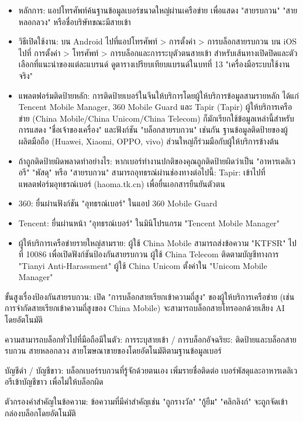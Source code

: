 
\begin{itemize}
  \item หลักการ: แอปโทรศัพท์ค้นฐานข้อมูลเบอร์ขนาดใหญ่ผ่านเครือข่าย เพื่อแสดง "สายรบกวน" "สายหลอกลวง" หรือชื่อบริษัทขณะมีสายเข้า
  \item วิธีเปิดใช้งาน: บน Android ไปที่แอปโทรศัพท์ > การตั้งค่า > การบล็อกสายรบกวน บน iOS ไปที่ การตั้งค่า > โทรศัพท์ > การบล็อกและการระบุตัวตนสายเข้า สำหรับเส้นทางเปิดปิดและตัวเลือกที่แนะนำของแต่ละแบรนด์ ดูตารางเปรียบเทียบแบรนด์ในบทที่ 13 "เครื่องมือระบบใช้งานจริง"
  \item แพลตฟอร์มติดป้ายหลัก: การติดป้ายเบอร์ในจีนให้บริการโดยผู้ให้บริการข้อมูลสามรายหลัก ได้แก่ Tencent Mobile Manager, 360 Mobile Guard และ Tapir (Tapir) ผู้ให้บริการเครือข่าย (China Mobile/China Unicom/China Telecom) ก็มักเรียกใช้ข้อมูลเหล่านี้สำหรับการแสดง "ชื่อเจ้าของเครื่อง" และฟังก์ชัน "บล็อกสายรบกวน" เช่นกัน ฐานข้อมูลติดป้ายของผู้ผลิตมือถือ (Huawei, Xiaomi, OPPO, vivo) ส่วนใหญ่ก็ร่วมมือกับผู้ให้บริการข้างต้น
  \item ถ้าถูกติดป้ายผิดพลาดทำอย่างไร: หากเบอร์ทำงานปกติของคุณถูกติดป้ายผิดว่าเป็น "อาหารเดลิเวอรี" "พัสดุ" หรือ "สายรบกวน" สามารถอุทธรณ์ผ่านช่องทางต่อไปนี้: Tapir: เข้าไปที่แพลตฟอร์มอุทธรณ์เบอร์ (haoma.tk.cn) เพื่อยื่นเอกสารยืนยันตัวตน
  \item 360: ยื่นผ่านฟังก์ชัน "อุทธรณ์เบอร์" ในแอป 360 Mobile Guard
  \item Tencent: ยื่นผ่านหน้า "อุทธรณ์เบอร์" ในมินิโปรแกรม "Tencent Mobile Manager"
  \item ผู้ให้บริการเครือข่ายรายใหญ่สามราย: ผู้ใช้ China Mobile สามารถส่งข้อความ "KTFSR" ไปที่ 10086 เพื่อเปิดฟังก์ชันป้องกันสายรบกวน ผู้ใช้ China Telecom ติดตามบัญชีทางการ "Tianyi Anti-Harassment" ผู้ใช้ China Unicom ตั้งค่าใน "Unicom Mobile Manager"
\end{itemize}

ขั้นสูงเรื่องป้องกันสายรบกวน: เปิด "การบล็อกสายเรียกเข้าความถี่สูง" ของผู้ให้บริการเครือข่าย (เช่น การจำกัดสายเรียกเข้าความถี่สูงของ China Mobile) จะสามารถบล็อกสายโทรออกด้วยเสียง AI โดยอัตโนมัติ

ความสามารถบล็อกทั่วไปที่มือถือมีในตัว: การระบุสายเข้า / การบล็อกอัจฉริยะ: ติดป้ายและบล็อกสายรบกวน สายหลอกลวง สายโฆษณาขายของโดยอัตโนมัติตามฐานข้อมูลเบอร์

บัญชีดำ / บัญชีขาว: บล็อกเบอร์รบกวนที่รู้จักด้วยตนเอง เพิ่มรายชื่อติดต่อ เบอร์พัสดุและอาหารเดลิเวอรีเข้าบัญชีขาว เพื่อไม่ให้บล็อกผิด

ตัวกรองคำสำคัญในข้อความ: ข้อความที่มีคำสำคัญเช่น "ถูกรางวัล" "กู้ยืม" "คลิกลิงก์" จะถูกจัดเข้ากล่องบล็อกโดยอัตโนมัติ

